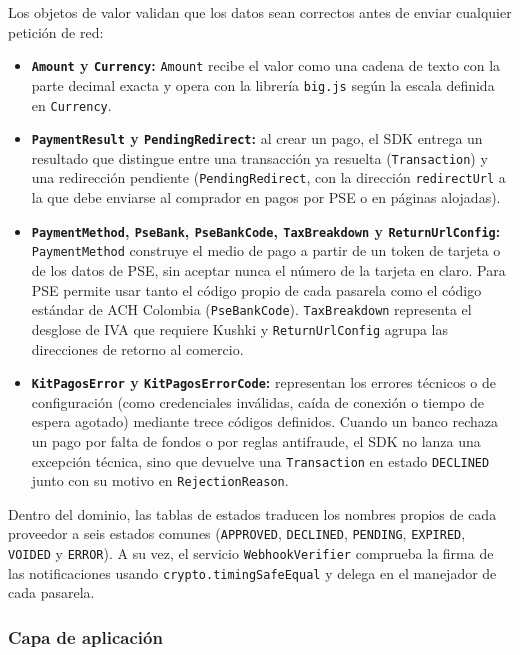 Los objetos de valor validan que los datos sean correctos antes de enviar cualquier petición de red:
\begin{itemize}
    \item \textbf{\texttt{Amount} y \texttt{Currency}:} \texttt{Amount} recibe el valor como una cadena de texto con la parte decimal exacta y opera con la librería \texttt{big.js} según la escala definida en \texttt{Currency}.
    \item \textbf{\texttt{PaymentResult} y \texttt{PendingRedirect}:} al crear un pago, el SDK entrega un resultado que distingue entre una transacción ya resuelta (\texttt{Transaction}) y una redirección pendiente (\texttt{PendingRedirect}, con la dirección \texttt{redirectUrl} a la que debe enviarse al comprador en pagos por PSE o en páginas alojadas).
    \item \textbf{\texttt{PaymentMethod}, \texttt{PseBank}, \texttt{PseBankCode}, \texttt{TaxBreakdown} y \texttt{ReturnUrlConfig}:} \texttt{PaymentMethod} construye el medio de pago a partir de un token de tarjeta o de los datos de PSE, sin aceptar nunca el número de la tarjeta en claro. Para PSE permite usar tanto el código propio de cada pasarela como el código estándar de ACH Colombia (\texttt{PseBankCode}). \texttt{TaxBreakdown} representa el desglose de IVA que requiere Kushki y \texttt{ReturnUrlConfig} agrupa las direcciones de retorno al comercio.
    \item \textbf{\texttt{KitPagosError} y \texttt{KitPagosErrorCode}:} representan los errores técnicos o de configuración (como credenciales inválidas, caída de conexión o tiempo de espera agotado) mediante trece códigos definidos. Cuando un banco rechaza un pago por falta de fondos o por reglas antifraude, el SDK no lanza una excepción técnica, sino que devuelve una \texttt{Transaction} en estado \texttt{DECLINED} junto con su motivo en \texttt{RejectionReason}.
\end{itemize}

Dentro del dominio, las tablas de estados traducen los nombres propios de cada proveedor a seis estados comunes (\texttt{APPROVED}, \texttt{DECLINED}, \texttt{PENDING}, \texttt{EXPIRED}, \texttt{VOIDED} y \texttt{ERROR}). A su vez, el servicio \texttt{WebhookVerifier} comprueba la firma de las notificaciones usando \texttt{crypto.timingSafeEqual} y delega en el manejador de cada pasarela.

\subsubsection{Capa de aplicación}

